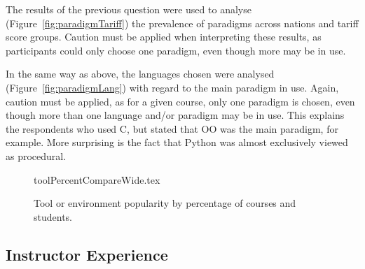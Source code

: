 \documentclass[a4paper,11pt]{article}
\begin{document}
The results of the previous question were used to analyse
(Figure~\ref{fig:paradigmTariff}) the prevalence of paradigms across
nations and tariff score groups. Caution must be applied when
interpreting these results, as participants could only choose one
paradigm, even though more may be in use.


In the same way as above, the languages chosen were analysed
(Figure~\ref{fig:paradigmLang}) with regard to the main paradigm in
use. Again, caution must be applied, as for a given course, only one
paradigm is chosen, even though more than one language and/or paradigm
may be in use. This explains the respondents who used C, but stated
that OO was the main paradigm, for example. More surprising is the
fact that Python was almost exclusively viewed as procedural.



%

\begin{figure}[ht]
\begin{center}
{toolPercentCompareWide.tex}
\caption{Tool or environment popularity by percentage of courses and students.\label{fig:tools}}
\end{center}
\end{figure}

\subsection{Instructor Experience}
\end{document}

